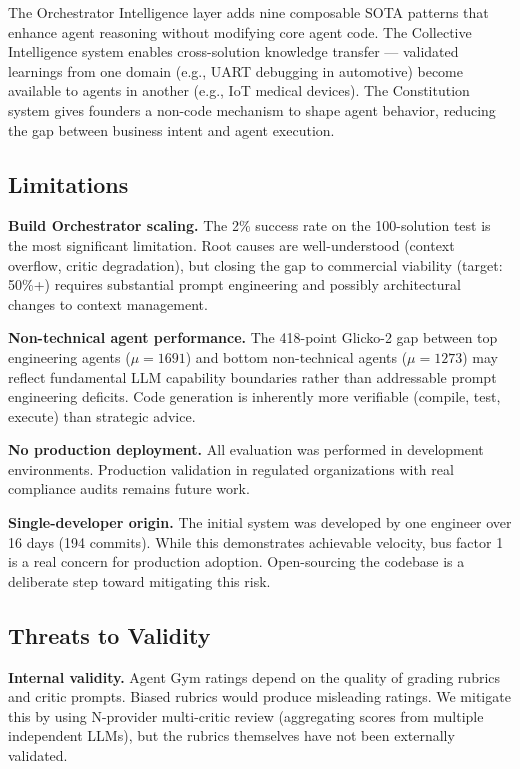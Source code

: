 \documentclass[11pt,a4paper]{article}
\begin{document}
The Orchestrator Intelligence layer adds nine composable SOTA patterns that enhance agent reasoning without modifying core agent code. The Collective Intelligence system enables cross-solution knowledge transfer --- validated learnings from one domain (e.g., UART debugging in automotive) become available to agents in another (e.g., IoT medical devices). The Constitution system gives founders a non-code mechanism to shape agent behavior, reducing the gap between business intent and agent execution.

\subsection{Limitations}

\textbf{Build Orchestrator scaling.} The 2\% success rate on the 100-solution test is the most significant limitation. Root causes are well-understood (context overflow, critic degradation), but closing the gap to commercial viability (target: 50\%+) requires substantial prompt engineering and possibly architectural changes to context management.

\textbf{Non-technical agent performance.} The 418-point Glicko-2 gap between top engineering agents ($\mu = 1691$) and bottom non-technical agents ($\mu = 1273$) may reflect fundamental LLM capability boundaries rather than addressable prompt engineering deficits. Code generation is inherently more verifiable (compile, test, execute) than strategic advice.

\textbf{No production deployment.} All evaluation was performed in development environments. Production validation in regulated organizations with real compliance audits remains future work.

\textbf{Single-developer origin.} The initial system was developed by one engineer over 16 days (194 commits). While this demonstrates achievable velocity, bus factor 1 is a real concern for production adoption. Open-sourcing the codebase is a deliberate step toward mitigating this risk.

\subsection{Threats to Validity}

\textbf{Internal validity.} Agent Gym ratings depend on the quality of grading rubrics and critic prompts. Biased rubrics would produce misleading ratings. We mitigate this by using N-provider multi-critic review (aggregating scores from multiple independent LLMs), but the rubrics themselves have not been externally validated.
\end{document}
